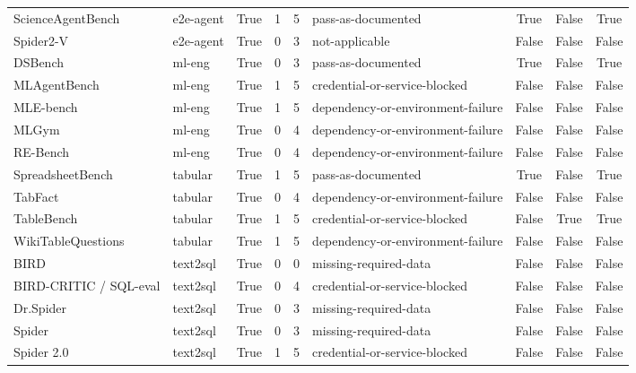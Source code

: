 \begin{table}[t]
\begin{tabular}{@{}p{2.0cm}p{0.95cm}cccp{1.70cm}ccc@{}}
ScienceAgentBench
& e2e-agent
& True & 1 & 5
& pass-as-documented
& True & False & True \\

Spider2-V
& e2e-agent
& True & 0 & 3
& not-applicable
& False & False & False \\

DSBench
& ml-eng
& True & 0 & 3
& pass-as-documented
& True & False & True \\

MLAgentBench
& ml-eng
& True & 1 & 5
& credential-or-service-blocked
& False & False & False \\

MLE-bench
& ml-eng
& True & 1 & 5
& dependency-or-environment-failure
& False & False & False \\

MLGym
& ml-eng
& True & 0 & 4
& dependency-or-environment-failure
& False & False & False \\

RE-Bench
& ml-eng
& True & 0 & 4
& dependency-or-environment-failure
& False & False & False \\

SpreadsheetBench
& tabular
& True & 1 & 5
& pass-as-documented
& True & False & True \\

TabFact
& tabular
& True & 0 & 4
& dependency-or-environment-failure
& False & False & False \\

TableBench
& tabular
& True & 1 & 5
& credential-or-service-blocked
& False & True & True \\

WikiTableQuestions
& tabular
& True & 1 & 5
& dependency-or-environment-failure
& False & False & False \\

BIRD
& text2sql
& True & 0 & 0
& missing-required-data
& False & False & False \\

BIRD-CRITIC / \newline SQL-eval
& text2sql
& True & 0 & 4
& credential-or-service-blocked
& False & False & False \\

Dr.Spider
& text2sql
& True & 0 & 3
& missing-required-data
& False & False & False \\

Spider
& text2sql
& True & 0 & 3
& missing-required-data
& False & False & False \\

Spider 2.0
& text2sql
& True & 1 & 5
& credential-or-service-blocked
& False & False & False \\

\bottomrule
\end{tabular}
\end{table}